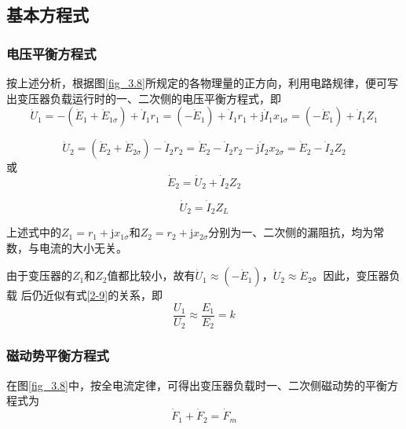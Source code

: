 \documentclass{book}
\begin{document}
\subsection{基本方程式}
\subsubsection{电压平衡方程式}
按上述分析，根据图\ref{fig_3.8}所规定的各物理量的正方向，利用电路规律，便可写出变压器负载运行时的一、二次侧的电压平衡方程式，即
\begin{equation}
{{\dot{U}}_{1}}=-\left( {{{\dot{E}}}_{1}}+{{{\dot{E}}}_{1\sigma }} \right)+{{\dot{I}}_{1}}{{r}_{1}}=\left( -{{{\dot{E}}}_{1}} \right)+{{\dot{I}}_{1}}{{r}_{1}}+\text{j}{{\dot{I}}_{1}}{{x}_{1\sigma }}=\left( -{{{\dot{E}}}_{1}} \right)+{{\dot{I}}_{1}}{{Z}_{1}}
\label{2-17}
\end{equation}

\begin{equation}
{{\dot{U}}_{2}}=\left( {{{\dot{E}}}_{2}}+{{{\dot{E}}}_{2\sigma }} \right)-{{\dot{I}}_{2}}{{r}_{2}}={{\dot{E}}_{2}}-{{\dot{I}}_{2}}{{r}_{2}}-\text{j}{{\dot{I}}_{2}}{{x}_{2\sigma }}={{\dot{E}}_{2}}-{{\dot{I}}_{2}}{{Z}_{2}}
\label{2-18}
\end{equation}
或
\begin{equation}
{{\dot{E}}_{2}}={{\dot{U}}_{2}}+{{\dot{I}}_{2}}{{Z}_{2}}
\label{2-19}
\end{equation}

\begin{equation}
{{\dot{U}}_{2}}={{\dot{I}}_{2}}{{Z}_{L}}
\label{2-20}
\end{equation}

上述式中的${{Z}_{1}}={{r}_{1}}+\text{j}{{x}_{1\sigma }}$和${{Z}_{2}}={{r}_{2}}+\text{j}{{x}_{2\sigma }}$分别为一、二次侧的漏阻抗，均为常数，与电流的大小无关。

由于变压器的${{Z}_{1}}$和${{Z}_{2}}$值都比较小，故有${{\dot{U}}_{1}}\approx \left( -{{{\dot{E}}}_{1}} \right)$，${{\dot{U}}_{2}}\approx {{\dot{E}}_{2}}$。因此，变压器负载 后仍近似有式\eqref{2-9}的关系，即
\[\frac{{{U}_{1}}}{{{U}_{2}}}\approx \frac{{{E}_{1}}}{{{E}_{2}}}=k\]

\subsubsection{磁动势平衡方程式}
在图\ref{fig_3.8}中，按全电流定律，可得出变压器负载时一、二次侧磁动势的平衡方程式为
\begin{equation}
{{\dot{F}}_{1}}+{{\dot{F}}_{2}}={{\dot{F}}_{m}}
\label{2-21}
\end{equation}
\end{document}
